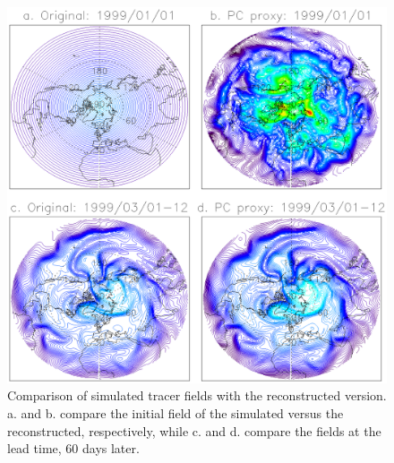 \documentclass{article}
\begin{document}
\begin{figure}
\begin{center}
\includegraphics[width=1\textwidth]{../pc_proxy/proxyfields.eps}
\caption{Comparison of simulated tracer fields with the reconstructed version.
a. and b. compare the initial field of the simulated versus the reconstructed,
respectively, while c. and d. compare the fields at the lead time,
60 days later.}
\label{proxyfields}
\end{center}
\end{figure}
\end{document}
